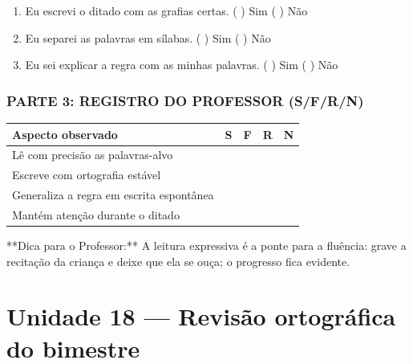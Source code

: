 \begin{exercicio}
\begin{enumerate}[label=\alph*)]
  \item Eu escrevi o ditado com as grafias certas.  \quad ( ) Sim   ( ) Não

  \item Eu separei as palavras em sílabas.  \quad ( ) Sim   ( ) Não

  \item Eu sei explicar a regra com as minhas palavras.  \quad ( ) Sim   ( ) Não

\end{enumerate}

\subsection*{PARTE 3: REGISTRO DO PROFESSOR (S/F/R/N)}

\begin{center}
\renewcommand{\arraystretch}{1.4}
\begin{tabular}{@{}p{9cm}cccc@{}}
\toprule
Aspecto observado & S & F & R & N \\
\midrule
Lê com precisão as palavras-alvo & & & & \\
Escreve com ortografia estável & & & & \\
Generaliza a regra em escrita espontânea & & & & \\
Mantém atenção durante o ditado & & & & \\
\bottomrule\end{tabular}\end{center}

\end{exercicio}

\begin{dica}
**Dica para o Professor:** A leitura expressiva é a ponte para a fluência: grave a recitação da criança e deixe que ela se ouça; o progresso fica evidente.
\end{dica}


\chapter{Unidade 18 --- Revisão ortográfica do bimestre}


